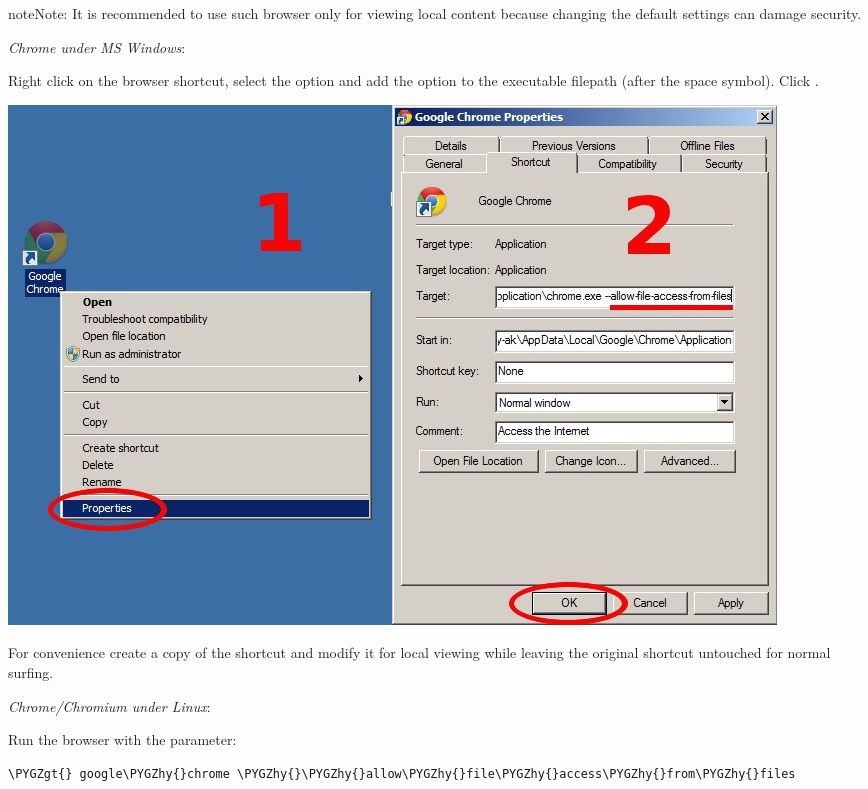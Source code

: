 \documentclass[a4paper,12pt,oneside]{sphinxmanual}
\def\PYGZgt{\char`\>}
\def\PYGZhy{\char`\-}
\begin{document}
\begin{notice}{note}{Note:}
It is recommended to use such browser only for viewing local content because changing the default settings can damage security.
\end{notice}

\emph{Chrome under MS Windows}:

Right click on the browser shortcut, select the  option and add the  option to the executable filepath (after the space symbol). Click .

\begin{DUlineblock}{0em}
\item[] 
\end{DUlineblock}

{\hfill\includegraphics[width=1.000\linewidth]{chrome_file_access.jpg}\hfill}

\begin{DUlineblock}{0em}
\item[] 
\end{DUlineblock}

For convenience create a copy of the shortcut and modify it for local viewing while leaving the original shortcut untouched for normal surfing.

\emph{Chrome/Chromium under Linux}:

Run the browser with the parameter:

\begin{Verbatim}[commandchars=\\\{\}]
\PYGZgt{} google\PYGZhy{}chrome \PYGZhy{}\PYGZhy{}allow\PYGZhy{}file\PYGZhy{}access\PYGZhy{}from\PYGZhy{}files
\end{Verbatim}
\end{document}
